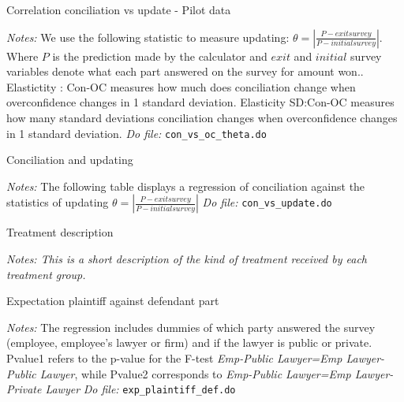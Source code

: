 \documentclass[11pt]{article}
\begin{document}
\begin{table}[H]
    \caption{Correlation conciliation vs update - Pilot data}
    \label{Table_concvsoc_theta}
    \begin{center}
        \scriptsize{}
    \end{center}
    \footnotesize
    \textit{Notes:} 
   We use the following statistic to measure updating: $\theta=\left|\frac{P-exitsurvey}{P-initialsurvey}\right|$. Where $P$ is the prediction made by the calculator and $exit$ and $initial$ survey variables denote what each part answered on the survey for amount won.. Elastictity : Con-OC measures how much does conciliation change when overconfidence changes in 1 standard deviation. Elasticity SD:Con-OC measures how many standard deviations conciliation changes when  overconfidence changes in 1 standard deviation.
    \textit{Do file: } \texttt{con\_vs\_oc\_theta.do}
\end{table}


\pagebreak

\begin{landscape}
\begin{table}[H]
    \caption{Conciliation and updating}
    \label{Con_update}
    \begin{center}
        \scriptsize{}
    \end{center}
    \footnotesize
    \textit{Notes:} 
   The following table displays a regression of conciliation against the statistics of updating $\theta=\left|\frac{P-exitsurvey}{P-initialsurvey}\right|$
    \textit{Do file: } \texttt{con\_vs\_update.do}
\end{table}
\end{landscape}



\begin{table}[H]
   \caption{Treatment description}
    \label{treatment_description}
    \begin{center}
    \scriptsize{}
    \end{center}
    \footnotesize
    \textit{Notes: This is a short description of the kind of treatment received by each treatment group.} 
\end{table}

\begin{landscape}

\begin{table}[H]
\caption{Expectation plaintiff against defendant part}
\label{Table_exp_plaintiff_def}
\begin{center}
\scriptsize{}
\end{center}
 \footnotesize
\textit{Notes:} 
The regression includes dummies of which party answered the survey (employee, employee's lawyer or firm) and if the lawyer is public or private. Pvalue1 refers to the p-value for the F-test \emph{ Emp-Public Lawyer=Emp Lawyer-Public Lawyer}, while Pvalue2 corresponds to \emph{ Emp-Public Lawyer=Emp Lawyer-Private Lawyer}
\textit{Do file: } \texttt{exp\_plaintiff\_def.do}
\end{table}

\end{landscape}
\end{document}
